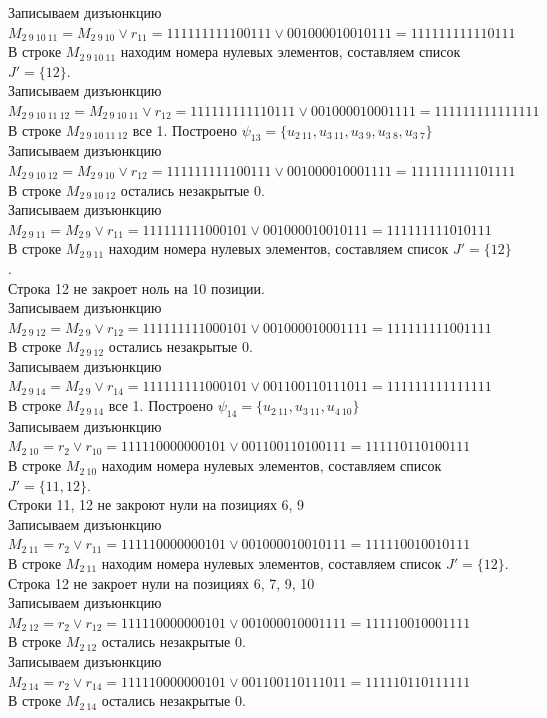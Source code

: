 \documentclass[a4paper,12pt]{article}
\begin{document}
Записываем дизъюнкцию $M_{2\ 9\ 10\ 11} = M_{2\ 9\ 10}\lor r_{11} = 111111111100111 \lor 001000010010111 = 111111111110111$\\
В строке $M_{2\ 9\ 10\ 11}$ находим номера нулевых элементов, составляем список $J' = \{12\}$.\\
Записываем дизъюнкцию $M_{2\ 9\ 10\ 11\ 12} = M_{2\ 9\ 10\ 11}\lor r_{12} = 111111111110111 \lor 001000010001111 = 111111111111111$\\
В строке $M_{2\ 9\ 10\ 11\ 12}$ все 1. Построено $\psi_{13} = \{u_{2\ 11},u_{3\ 11},u_{3\ 9},u_{3\ 8},u_{3\ 7}\}$\\
Записываем дизъюнкцию $M_{2\ 9\ 10\ 12} = M_{2\ 9\ 10}\lor r_{12} = 111111111100111 \lor 001000010001111 = 111111111101111$\\
В строке $M_{2\ 9\ 10\ 12}$ остались незакрытые 0.\\
Записываем дизъюнкцию $M_{2\ 9\ 11} = M_{2\ 9}\lor r_{11} = 111111111000101 \lor 001000010010111 = 111111111010111$\\
В строке $M_{2\ 9\ 11}$ находим номера нулевых элементов, составляем список $J' = \{12\}$.\\
Строка 12 не закроет ноль на 10 позиции.\\
Записываем дизъюнкцию $M_{2\ 9\ 12} = M_{2\ 9}\lor r_{12} = 111111111000101 \lor 001000010001111 = 111111111001111$\\
В строке $M_{2\ 9\ 12}$ остались незакрытые 0.\\
Записываем дизъюнкцию $M_{2\ 9\ 14} = M_{2\ 9}\lor r_{14} = 111111111000101 \lor 001100110111011 = 111111111111111$\\
В строке $M_{2\ 9\ 14}$ все 1. Построено $\psi_{14} = \{u_{2\ 11},u_{3\ 11},u_{4\ 10}\}$\\
Записываем дизъюнкцию $M_{2\ 10} = r_{2}\lor r_{10} = 111110000000101 \lor 001100110100111 = 111110110100111$\\
В строке $M_{2\ 10}$ находим номера нулевых элементов, составляем список $J' = \{11, 12\}$.\\
Строки 11, 12 не закроют нули на позициях 6, 9\\
Записываем дизъюнкцию $M_{2\ 11} = r_{2}\lor r_{11} = 111110000000101 \lor 001000010010111 = 111110010010111$\\
В строке $M_{2\ 11}$ находим номера нулевых элементов, составляем список $J' = \{12\}$.\\
Строка 12 не закроет нули на позициях 6, 7, 9, 10\\
Записываем дизъюнкцию $M_{2\ 12} = r_{2}\lor r_{12} = 111110000000101 \lor 001000010001111 = 111110010001111$\\
В строке $M_{2\ 12}$ остались незакрытые 0.\\
Записываем дизъюнкцию $M_{2\ 14} = r_{2}\lor r_{14} = 111110000000101 \lor 001100110111011 = 111110110111111$\\
В строке $M_{2\ 14}$ остались незакрытые 0.\\
\end{document}
